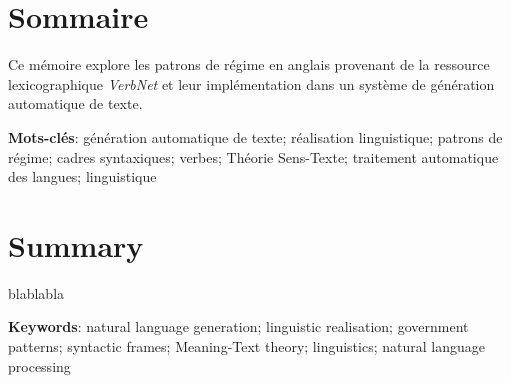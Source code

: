 \chapter*{Sommaire} 	%

\noindent Ce mémoire explore les patrons de régime en anglais provenant de la ressource lexicographique \emph{VerbNet} et leur implémentation dans un système de génération automatique de texte.


\textbf{Mots-clés}: génération automatique de texte; réalisation linguistique; patrons de régime; cadres syntaxiques; verbes; Théorie Sens-Texte; traitement automatique des langues; linguistique

\chapter*{Summary}

\noindent blablabla

\textbf{Keywords}: natural language generation; linguistic realisation; government patterns; syntactic frames; Meaning-Text theory; linguistics; natural language processing